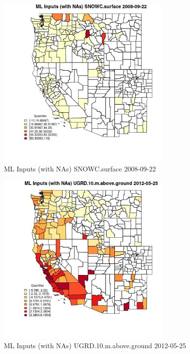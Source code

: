 \begin{figure} 
\centering  
\includegraphics[width=0.77\textwidth]{Code_Outputs/Report_ML_input_PM25_Step4_part_e_de_duplicated_aves_compiled_2019-05-18wNAs_CountySNOWCsurfaceMean2008-09-22_2008-09-22.jpg} 
\caption{\label{fig:Report_ML_input_PM25_Step4_part_e_de_duplicated_aves_compiled_2019-05-18wNAsCountySNOWCsurfaceMean2008-09-22_2008-09-22}ML Inputs (with NAs) SNOWC.surface 2008-09-22} 
\end{figure} 
 

\begin{figure} 
\centering  
\includegraphics[width=0.77\textwidth]{Code_Outputs/Report_ML_input_PM25_Step4_part_e_de_duplicated_aves_compiled_2019-05-18wNAs_CountyUGRD10mabovegroundMean2012-05-25_2012-05-25.jpg} 
\caption{\label{fig:Report_ML_input_PM25_Step4_part_e_de_duplicated_aves_compiled_2019-05-18wNAsCountyUGRD10mabovegroundMean2012-05-25_2012-05-25}ML Inputs (with NAs) UGRD.10.m.above.ground 2012-05-25} 
\end{figure} 
 


